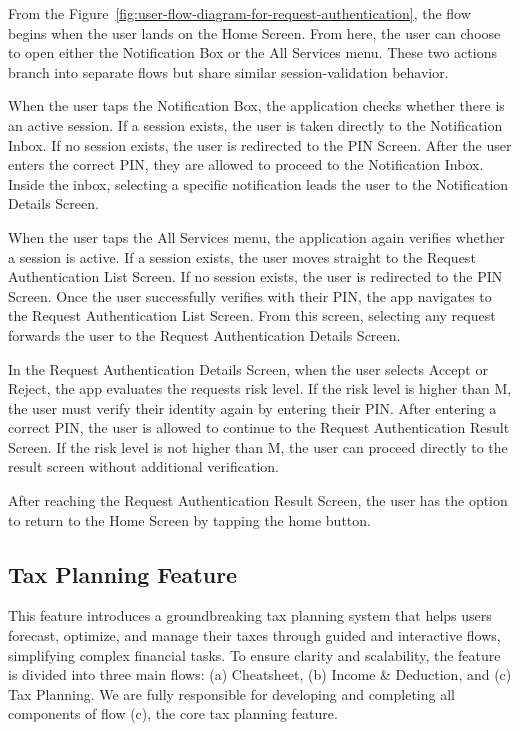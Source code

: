 \documentclass[12pt,oneside,openright,a4paper]{cpe-english-project}
\begin{document}
From the Figure~\ref{fig:user-flow-diagram-for-request-authentication}, the flow begins when the user lands on the Home Screen. From here, the
user can choose to open either the Notification Box or the All Services
menu. These two actions branch into separate flows but share similar
session-validation behavior.

When the user taps the Notification Box, the application checks whether
there is an active session. If a session exists, the user is taken
directly to the Notification Inbox. If no session exists, the user is
redirected to the PIN Screen. After the user enters the correct PIN,
they are allowed to proceed to the Notification Inbox. Inside the inbox,
selecting a specific notification leads the user to the Notification
Details Screen.

When the user taps the All Services menu, the application again verifies
whether a session is active. If a session exists, the user moves
straight to the Request Authentication List Screen. If no session
exists, the user is redirected to the PIN Screen. Once the user
successfully verifies with their PIN, the app navigates to the Request
Authentication List Screen. From this screen, selecting any request
forwards the user to the Request Authentication Details Screen.

In the Request Authentication Details Screen, when the user selects
Accept or Reject, the app evaluates the request\textquotesingle s risk
level. If the risk level is higher than M, the user must verify their
identity again by entering their PIN. After entering a correct PIN, the
user is allowed to continue to the Request Authentication Result Screen.
If the risk level is not higher than M, the user can proceed directly to
the result screen without additional verification.

After reaching the Request Authentication Result Screen, the user has
the option to return to the Home Screen by tapping the home button.

\subsection{Tax Planning Feature}

This feature introduces a groundbreaking tax planning system that helps
users forecast, optimize, and manage their taxes through guided and
interactive flows, simplifying complex financial tasks. To ensure
clarity and scalability, the feature is divided into three main flows:
(a) Cheatsheet, (b) Income \& Deduction, and (c) Tax Planning. We are
fully responsible for developing and completing all components of flow
(c), the core tax planning feature.
\end{document}

